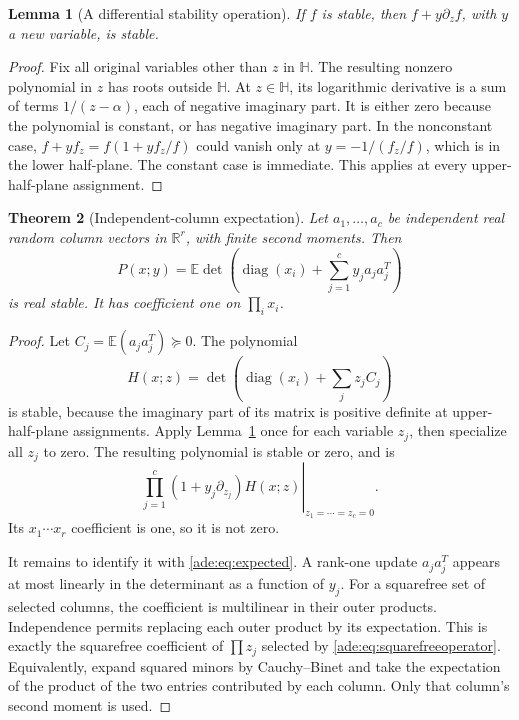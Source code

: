 \documentclass[11pt]{article}
\numberwithin{equation}{section}
\newtheorem{theorem}{Theorem}[section]
\newtheorem{lemma}[theorem]{Lemma}
\theoremstyle{definition}
\newcommand{\R}{\mathbb R}
\newcommand{\diag}{\operatorname{diag}}
\newcommand{\EE}{\mathbb E}
\newcommand{\HH}{\mathbb H}
\begin{document}
\begin{lemma}[A differential stability operation]
\label{ade:lem:operator}
If $f$ is stable, then $f+y\partial_z f$, with $y$ a new variable, is
stable.
\end{lemma}
\begin{proof}
Fix all original variables other than $z$ in $\HH$.  The resulting
nonzero polynomial in $z$ has roots outside $\HH$.  At $z\in\HH$, its
logarithmic derivative is a sum of terms $1/(z-\alpha)$, each of negative
imaginary part.  It is either zero because the polynomial is constant, or
has negative imaginary part.  In the nonconstant case,
$f+yf_z=f(1+y f_z/f)$ could vanish only at
$y=-1/(f_z/f)$, which is in the lower half-plane.  The constant case is
immediate.  This applies at every upper-half-plane assignment.
\end{proof}

\begin{theorem}[Independent-column expectation]
\label{ade:thm:expected}
Let $a_1,\ldots,a_c$ be independent real random column vectors in
$\R^r$, with finite second moments.  Then
\begin{equation}
 P(x;y)=\EE\det\left(\diag(x_i)+\sum_{j=1}^c y_j a_ja_j^T\right)
 \label{ade:eq:expected}
\end{equation}
is real stable.  It has coefficient one on $\prod_i x_i$.
\end{theorem}
\begin{proof}
Let $C_j=\EE(a_ja_j^T)\succeq0$.  The polynomial
\[
 H(x;z)=\det\left(\diag(x_i)+\sum_j z_j C_j\right)
\]
is stable, because the imaginary part of its matrix is positive definite
at upper-half-plane assignments.
Apply Lemma~\ref{ade:lem:operator} once for each variable $z_j$, then
specialize all $z_j$ to zero.  The resulting polynomial is stable or zero,
and is
\begin{equation}
 \left.
 \prod_{j=1}^c(1+y_j\partial_{z_j})H(x;z)
 \right|_{z_1=\cdots=z_c=0}.
 \label{ade:eq:squarefreeoperator}
\end{equation}
Its $x_1\cdots x_r$ coefficient is one, so it is not zero.

It remains to identify it with \eqref{ade:eq:expected}.  A rank-one update
$a_ja_j^T$ appears at most linearly in the determinant as a function of
$y_j$.  For a squarefree set of selected columns, the coefficient is
multilinear in their outer products.  Independence permits replacing each
outer product by its expectation.  This is exactly the squarefree
coefficient of $\prod z_j$ selected by \eqref{ade:eq:squarefreeoperator}.
Equivalently, expand squared minors by Cauchy--Binet and take the
expectation of the product of the two entries contributed by each column.
Only that column's second moment is used.
\end{proof}
\end{document}
